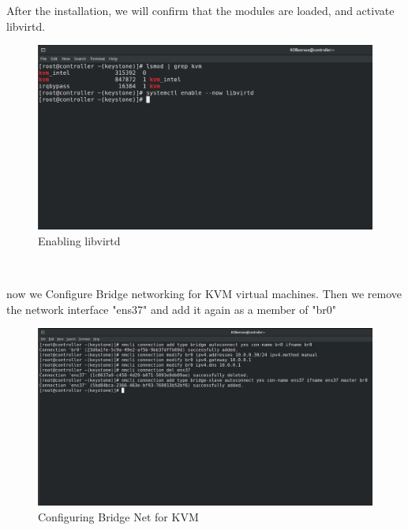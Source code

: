 \begin{spacing}{1.2}
\par After the installation, we will confirm that the modules are loaded, and activate libvirtd. 
\\
\begin{figure}[!htb] 
\begin{center} 
\includegraphics[width=1\linewidth]{Cloud/Add Virtual Machine Images/KVM Install/Enabling libvirtd} 
\end{center} 
\caption{Enabling libvirtd} 
\end{figure}  \FloatBarrier
\\

\par now we Configure Bridge networking for KVM virtual machines. Then we remove the network interface "ens37" and add it again as a member of "br0"
\\
\begin{figure}[!htb] 
\begin{center} 
\includegraphics[width=1\linewidth]{Cloud/Add Virtual Machine Images/KVM Install/Configuring Bridge Net for KVM} 
\end{center} 
\caption{Configuring Bridge Net for KVM} 
\end{figure}  \FloatBarrier
\\


\end{spacing}
